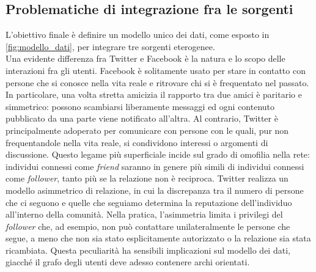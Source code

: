 \subsection{Problematiche di integrazione fra le sorgenti}
L'obiettivo finale \`e definire un modello unico dei dati, come esposto in \autoref{fig:modello_dati}, per integrare tre sorgenti eterogenee.\\
Una evidente differenza fra Twitter e Facebook \`e la natura e lo scopo delle interazioni fra gli utenti. Facebook \`e solitamente usato per stare in contatto con persone che si conosce nella vita reale e ritrovare chi si \`e frequentato nel passato. In particolare, una volta stretta amicizia il rapporto tra due amici \`e paritario e simmetrico: possono scambiarsi liberamente messaggi ed ogni contenuto pubblicato da una parte viene notificato all'altra. Al contrario, Twitter \`e principalmente adoperato per comunicare con persone con le quali, pur non frequentandole nella vita reale, si condividono interessi o argomenti di discussione. Questo legame pi\`u superficiale incide sul grado di omofilia nella rete: individui connessi come \textit{friend} saranno in genere pi\`u simili di individui connessi come \textit{follower}, tanto pi\`u se la relazione non \`e reciproca. Twitter realizza un modello asimmetrico di relazione, in cui la discrepanza tra il numero di persone che ci seguono e quelle che seguiamo determina la reputazione dell'individuo all'interno della comunit\`a. Nella pratica, l'asimmetria limita i privilegi del \textit{follower} che, ad esempio, non pu\`o contattare unilateralmente le persone che segue, a meno che non sia stato esplicitamente autorizzato o la relazione sia stata ricambiata. Questa peculiarit\`a ha sensibili implicazioni sul modello dei dati, giacch\'e il grafo degli utenti deve adesso contenere archi orientati.\\
